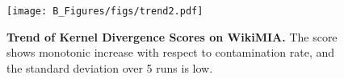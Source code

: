 
\begin{figure}[t!]
    \begin{center}
    \texttt{[image: B\_Figures/figs/trend2.pdf]}
    \end{center}
    \vspace{-3mm}
    \caption{\textbf{Trend of Kernel Divergence Scores on WikiMIA.} The score shows monotonic increase with respect to contamination rate, and the standard deviation over 5 runs is low. %
    }
\vspace{-3mm}
\label{fig:consistency_verification}
\end{figure}